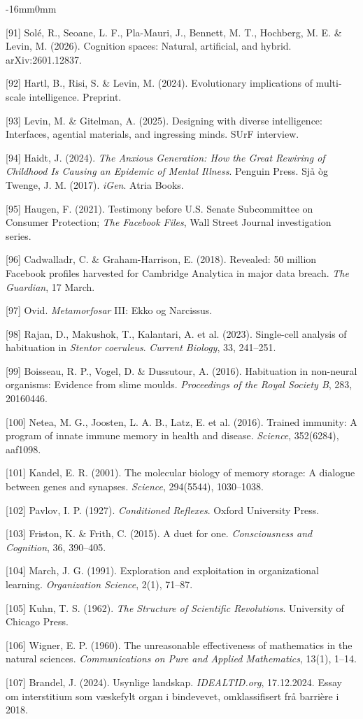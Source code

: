 \documentclass[10pt,oneside]{book}
\newcommand{\refentry}[1]{%
  \par\addvspace{0pt}%
  \begingroup\footnotesize\linespread{0.92}\selectfont
  \noindent\hangindent=4mm\hangafter=1 #1\par%
  \endgroup
}
\newenvironment{widebody}{%
  \begin{adjustwidth}{-16mm}{0mm}%
}{%
  \end{adjustwidth}%
}
\begin{document}
\begin{widebody}
\refentry{[91] Sol{\'e}, R., Seoane, L. F., Pla-Mauri, J., Bennett, M. T., Hochberg, M. E. \& Levin, M. (2026). Cognition spaces: Natural, artificial, and hybrid. arXiv:2601.12837.}
\refentry{[92] Hartl, B., Risi, S. \& Levin, M. (2024). Evolutionary implications of multi-scale intelligence. Preprint.}
\refentry{[93] Levin, M. \& Gitelman, A. (2025). Designing with diverse intelligence: Interfaces, agential materials, and ingressing minds. SUrF interview.}
\refentry{[94] Haidt, J. (2024). \textit{The Anxious Generation: How the Great Rewiring of Childhood Is Causing an Epidemic of Mental Illness}. Penguin Press. Sjå òg Twenge, J. M. (2017). \textit{iGen}. Atria Books.}
\refentry{[95] Haugen, F. (2021). Testimony before U.S. Senate Subcommittee on Consumer Protection; \textit{The Facebook Files}, Wall Street Journal investigation series.}
\refentry{[96] Cadwalladr, C. \& Graham-Harrison, E. (2018). Revealed: 50 million Facebook profiles harvested for Cambridge Analytica in major data breach. \textit{The Guardian}, 17 March.}
\refentry{[97] Ovid. \textit{Metamorfosar} III: Ekko og Narcissus.}
\refentry{[98] Rajan, D., Makushok, T., Kalantari, A. et al. (2023). Single-cell analysis of habituation in \textit{Stentor coeruleus}. \textit{Current Biology}, 33, 241--251.}
\refentry{[99] Boisseau, R. P., Vogel, D. \& Dussutour, A. (2016). Habituation in non-neural organisms: Evidence from slime moulds. \textit{Proceedings of the Royal Society B}, 283, 20160446.}
\refentry{[100] Netea, M. G., Joosten, L. A. B., Latz, E. et al. (2016). Trained immunity: A program of innate immune memory in health and disease. \textit{Science}, 352(6284), aaf1098.}
\refentry{[101] Kandel, E. R. (2001). The molecular biology of memory storage: A dialogue between genes and synapses. \textit{Science}, 294(5544), 1030--1038.}
\refentry{[102] Pavlov, I. P. (1927). \textit{Conditioned Reflexes}. Oxford University Press.}
\refentry{[103] Friston, K. \& Frith, C. (2015). A duet for one. \textit{Consciousness and Cognition}, 36, 390--405.}
\refentry{[104] March, J. G. (1991). Exploration and exploitation in organizational learning. \textit{Organization Science}, 2(1), 71--87.}
\refentry{[105] Kuhn, T. S. (1962). \textit{The Structure of Scientific Revolutions}. University of Chicago Press.}
\refentry{[106] Wigner, E. P. (1960). The unreasonable effectiveness of mathematics in the natural sciences. \textit{Communications on Pure and Applied Mathematics}, 13(1), 1--14.}
\refentry{[107] Brandel, J. (2024). Usynlige landskap. \textit{IDEALTID.org}, 17.12.2024. Essay om interstitium som væskefylt organ i bindevevet, omklassifisert frå barrière i 2018.}
\end{widebody}
\end{document}
